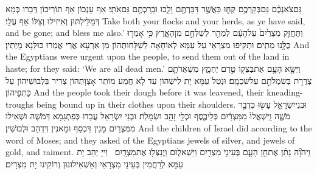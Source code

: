 {גַּם\maqqaf צֹאנְכֶ֨ם גַּם\maqqaf בְּקַרְכֶ֥ם קְח֛וּ כַּאֲשֶׁ֥ר דִּבַּרְתֶּ֖ם וָלֵ֑כוּ וּבֵֽרַכְתֶּ֖ם גַּם\maqqaf אֹתִֽי׃}
{אַף עָנְכוֹן אַף תּוֹרֵיכוֹן דְּבַרוּ כְּמָא דְּמַלֵּילְתּוּן וְאִיזִילוּ וְצַלּוֹ אַף עֲלָי׃}
{Take both your flocks and your herds, as ye have said, and be gone; and bless me also.’}{}
{וַתֶּחֱזַ֤ק מִצְרַ֙יִם֙ עַל\maqqaf הָעָ֔ם לְמַהֵ֖ר לְשַׁלְּחָ֣ם מִן\maqqaf הָאָ֑רֶץ כִּ֥י אָמְר֖וּ כֻּלָּ֥נוּ מֵתִֽים׃}
{וּתְקִיפוּ מִצְרָאֵי עַל עַמָּא לְאוֹחָאָה לְשַׁלָּחוּתְהוֹן מִן אַרְעָא אֲרֵי אֲמַרוּ כּוּלַּנָא מָיְתִין׃}
{And the Egyptians were urgent upon the people, to send them out of the land in haste; for they said: ‘We are all dead men.’}{}
{וַיִּשָּׂ֥א הָעָ֛ם אֶת\maqqaf בְּצֵק֖וֹ טֶ֣רֶם יֶחְמָ֑ץ מִשְׁאֲרֹתָ֛ם צְרֻרֹ֥ת בְּשִׂמְלֹתָ֖ם עַל\maqqaf שִׁכְמָֽם׃}
{וּנְטַל עַמָּא יָת לֵישְׁהוֹן עַד לָא חֲמַע מוֹתַר אָצְוָתְהוֹן צְרִיר בִּלְבוּשֵׁיהוֹן עַל כַּתְפֵיהוֹן׃}
{And the people took their dough before it was leavened, their kneading-troughs being bound up in their clothes upon their shoulders.}{}
{וּבְנֵי\maqqaf יִשְׂרָאֵ֥ל עָשׂ֖וּ כִּדְבַ֣ר מֹשֶׁ֑ה וַֽיִּשְׁאֲלוּ֙ מִמִּצְרַ֔יִם כְּלֵי\maqqaf כֶ֛סֶף וּכְלֵ֥י זָהָ֖ב וּשְׂמָלֹֽת׃}
{וּבְנֵי יִשְׂרָאֵל עֲבַדוּ כְּפִתְגָמָא דְּמֹשֶׁה וּשְׁאִילוּ מִמִּצְרַיִם מָנִין דִּכְסַף וּמָאנִין דִּדְהַב וּלְבוּשִׁין׃}
{And the children of Israel did according to the word of Moses; and they asked of the Egyptians jewels of silver, and jewels of gold, and raiment.}{}
{וַֽיהֹוָ֞ה נָתַ֨ן אֶת\maqqaf חֵ֥ן הָעָ֛ם בְּעֵינֵ֥י מִצְרַ֖יִם וַיַּשְׁאִל֑וּם וַֽיְנַצְּל֖וּ אֶת\maqqaf מִצְרָֽיִם׃ \petucha }
{וַייָ יְהַב יָת עַמָּא לְרַחֲמִין בְּעֵינֵי מִצְרָאֵי וְאַשְׁאִילוּנוּן וְרוֹקִינוּ יָת מִצְרָיִם׃}
